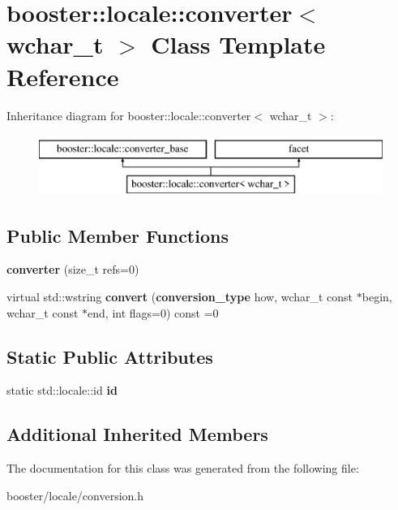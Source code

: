 \section{booster\-:\-:locale\-:\-:converter$<$ wchar\-\_\-t $>$ Class Template Reference}
\label{classbooster_1_1locale_1_1converter_3_01wchar__t_01_4}
Inheritance diagram for booster\-:\-:locale\-:\-:converter$<$ wchar\-\_\-t $>$\-:\begin{figure}[H]
\begin{center}
\leavevmode
\includegraphics[height=2.000000cm]{classbooster_1_1locale_1_1converter_3_01wchar__t_01_4}
\end{center}
\end{figure}
\subsection*{Public Member Functions}
\begin{DoxyCompactItemize}
\item 
{\bfseries converter} (size\-\_\-t refs=0)\label{classbooster_1_1locale_1_1converter_3_01wchar__t_01_4_aa7adfa8dc0dd7a8482d72748da609e6a}

\item 
virtual std\-::wstring {\bfseries convert} ({\bf conversion\-\_\-type} how, wchar\-\_\-t const $\ast$begin, wchar\-\_\-t const $\ast$end, int flags=0) const =0\label{classbooster_1_1locale_1_1converter_3_01wchar__t_01_4_a692b0eda1ce3dc7254ef7eb15b95bde3}

\end{DoxyCompactItemize}
\subsection*{Static Public Attributes}
\begin{DoxyCompactItemize}
\item 
static std\-::locale\-::id {\bfseries id}\label{classbooster_1_1locale_1_1converter_3_01wchar__t_01_4_a5f9ba76a1f6e2999f3477df7d9657bf0}

\end{DoxyCompactItemize}
\subsection*{Additional Inherited Members}


The documentation for this class was generated from the following file\-:\begin{DoxyCompactItemize}
\item 
booster/locale/conversion.\-h\end{DoxyCompactItemize}
